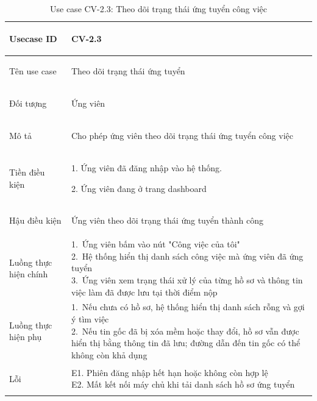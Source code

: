 \begin{table}[H]
    \centering
    \small
    \renewcommand{\arraystretch}{1.0}
    \begin{tabularx}{\textwidth}{|
        >{\bfseries\raggedright\arraybackslash}p{3.2cm}|Y|}
        \hline

        Usecase ID& CV-2.3 \\ \hline

        Tên use case & Theo dõi trạng thái ứng tuyển\\ \hline

        Đối tượng & Ứng viên \\ \hline

        Mô tả & Cho phép ứng viên theo dõi trạng thái ứng tuyển công việc\\ \hline

        Tiền điều kiện &
        \parbox[t]{\hsize}{
            1. Ứng viên đã đăng nhập vào hệ thống.\par
            2. Ứng viên đang ở trang dashboard\par
        } \\
        \hline

        Hậu điều kiện & Ứng viên theo dõi trạng thái ứng tuyển thành công \\ \hline

        Luồng thực hiện chính&
        \parbox[t]{\hsize}{
            1.\ Ứng viên bấm vào nút "Công việc của tôi"\\
            2.\ Hệ thống hiển thị danh sách công việc mà ứng viên đã ứng tuyển\\
            3.\ Ứng viên xem trạng thái xử lý của từng hồ sơ và thông tin việc làm đã được lưu tại thời điểm nộp
        }\\
        \hline

        Luồng thực hiện phụ&
        \parbox[t]{\hsize}{
            1.\ Nếu chưa có hồ sơ, hệ thống hiển thị danh sách rỗng và gợi ý tìm việc\\
            2.\ Nếu tin gốc đã bị xóa mềm hoặc thay đổi, hồ sơ vẫn được hiển thị bằng thông tin đã lưu; đường dẫn đến tin gốc có thể không còn khả dụng
        }\\
        \hline
        

        Lỗi &
        \parbox[t]{\hsize}{
            E1. Phiên đăng nhập hết hạn hoặc không còn hợp lệ\\
            E2. Mất kết nối máy chủ khi tải danh sách hồ sơ ứng tuyển
        }\\
        \hline

    \end{tabularx}

    \caption{Use case CV-2.3: Theo dõi trạng thái ứng tuyển công việc}
    \label{tab:usecase-cv23}
\end{table}
\clearpage

